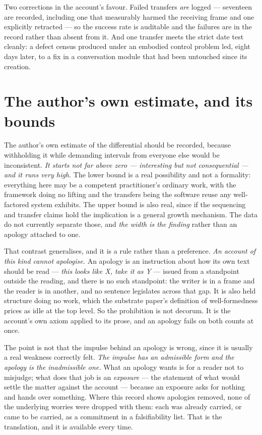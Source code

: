 \documentclass[11pt,a4paper]{article}
\theoremstyle{remark}\newtheorem{remark}[definition]{Remark}
\begin{document}
Two corrections in the account's favour. Failed transfers \emph{are} logged --- seventeen are recorded,
including one that measurably harmed the receiving frame and one explicitly retracted --- so the
success rate is auditable and the failures are in the record rather than absent from it. And one
transfer meets the strict date test cleanly: a defect census produced under an embodied control problem
led, eight days later, to a fix in a conversation module that had been untouched since its creation.

\section{The author's own estimate, and its bounds}\label{sec:estimate}

The author's own estimate of the differential should be recorded, because withholding it while
demanding intervals from everyone else would be inconsistent. \emph{It starts not far above zero ---
interesting but not consequential --- and it runs very high.} The lower bound is a real possibility and
not a formality: everything here may be a competent practitioner's ordinary work, with the framework
doing no lifting and the transfers being the software reuse any well-factored system exhibits. The
upper bound is also real, since if the sequencing and transfer claims hold the implication is a general
growth mechanism. The data do not currently separate those, and \emph{the width is the finding} rather than an apology attached to one.

That contrast generalises, and it is a rule rather than a preference. \emph{An account of this kind
cannot apologise.} An apology is an instruction about how its own text should be read --- \emph{this
looks like X, take it as Y} --- issued from a standpoint outside the reading, and there is no such
standpoint: the writer is in a frame and the reader is in another, and no sentence legislates across
that gap. It is also held structure doing no work, which the substrate paper's definition of
well-formedness prices as idle at the top level. So the prohibition is not decorum. It is the account's
own axiom applied to its prose, and an apology fails on both counts at once.

The point is not that the impulse behind an apology is wrong, since it is usually a real weakness
correctly felt. \emph{The impulse has an admissible form and the apology is the inadmissible one.} What
an apology wants is for a reader not to misjudge; what does that job is an \emph{exposure} --- the
statement of what would settle the matter against the account --- because an exposure asks for nothing
and hands over something. Where this record shows apologies removed, none of the underlying worries
were dropped with them: each was already carried, or came to be carried, as a commitment in a
falsifiability list. That is the translation, and it is available every time.
\end{document}
